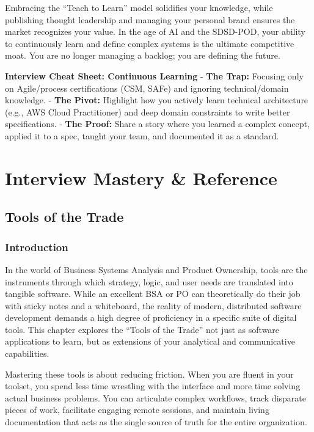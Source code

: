 \documentclass[
  11pt,
  openany,
  oneside]{book}
\renewenvironment{quote}{\begin{customquote}}{\end{customquote}}
\begin{document}
Embracing the ``Teach to Learn'' model solidifies your knowledge, while
publishing thought leadership and managing your personal brand ensures
the market recognizes your value. In the age of AI and the SDSD-POD,
your ability to continuously learn and define complex systems is the
ultimate competitive moat. You are no longer managing a backlog; you are
defining the future.

\begin{quote}
\textbf{Interview Cheat Sheet: Continuous Learning} - \textbf{The Trap:}
Focusing only on Agile/process certifications (CSM, SAFe) and ignoring
technical/domain knowledge. - \textbf{The Pivot:} Highlight how you
actively learn technical architecture (e.g., AWS Cloud Practitioner) and
deep domain constraints to write better specifications. - \textbf{The
Proof:} Share a story where you learned a complex concept, applied it to
a spec, taught your team, and documented it as a standard.
\end{quote}

\part{Interview Mastery \& Reference}

\chapter{Tools of the Trade}\label{tools-of-the-trade}

\section{Introduction}\label{introduction-2}

In the world of Business Systems Analysis and Product Ownership, tools
are the instruments through which strategy, logic, and user needs are
translated into tangible software. While an excellent BSA or PO can
theoretically do their job with sticky notes and a whiteboard, the
reality of modern, distributed software development demands a high
degree of proficiency in a specific suite of digital tools. This chapter
explores the ``Tools of the Trade'' not just as software applications to
learn, but as extensions of your analytical and communicative
capabilities.

Mastering these tools is about reducing friction. When you are fluent in
your toolset, you spend less time wrestling with the interface and more
time solving actual business problems. You can articulate complex
workflows, track disparate pieces of work, facilitate engaging remote
sessions, and maintain living documentation that acts as the single
source of truth for the entire organization.
\end{document}
